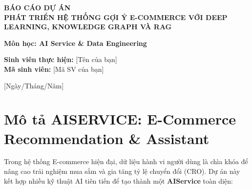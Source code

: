 \documentclass[12pt,a4paper]{article}
\begin{document}
\begin{titlepage}
    \centering
    \vspace*{2cm}
    
    \Huge
    \textbf{BÁO CÁO DỰ ÁN}\\
    \vspace{0.5cm}
    \Large
    \textbf{PHÁT TRIỂN HỆ THỐNG GỢI Ý E-COMMERCE VỚI DEEP LEARNING, KNOWLEDGE GRAPH VÀ RAG}
    
    \vspace{2cm}
    
    \large
    \textbf{Môn học: AI Service \& Data Engineering} \\
    
    \vspace{4cm}
    
    \textbf{Sinh viên thực hiện:} [Tên của bạn] \\
    \textbf{Mã sinh viên:} [Mã SV của bạn] \\
    
    \vfill
    
    \Large
    [Ngày/Tháng/Năm]
    
\end{titlepage}

\newpage
\tableofcontents
\newpage

\section{Mô tả AISERVICE: E-Commerce Recommendation \& Assistant}

Trong hệ thống E-commerce hiện đại, dữ liệu hành vi người dùng là chìa khóa để nâng cao trải nghiệm mua sắm và gia tăng tỷ lệ chuyển đổi (CRO). Dự án này kết hợp nhiều kỹ thuật AI tiên tiến để tạo thành một \textbf{AIService} toàn diện:
\end{document}
